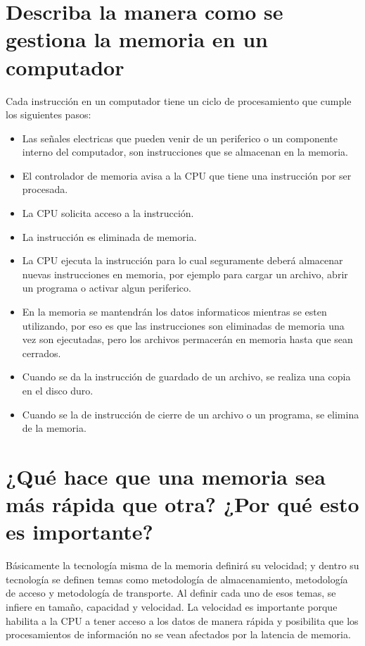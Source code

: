 \documentclass{article}
\begin{document}
\section{Describa la manera como se gestiona la memoria en un computador} 
Cada instrucción en un computador tiene un ciclo de procesamiento que cumple los siguientes pasos:
\begin{itemize}
    \item Las señales electricas que pueden venir de un periferico o un componente interno del computador, son instrucciones que se almacenan en la memoria.
    \item El controlador de memoria avisa a la CPU que tiene una instrucción por ser procesada.
    \item La CPU solicita acceso a la instrucción.
    \item La instrucción es eliminada de memoria.
    \item La CPU ejecuta la instrucción para lo cual seguramente deberá almacenar nuevas instrucciones en memoria, por ejemplo para cargar un archivo, abrir un programa o activar algun periferico.
    \item En la memoria se mantendrán los datos informaticos mientras se esten utilizando, por eso es que las instrucciones son eliminadas de memoria una vez son ejecutadas, pero los archivos permacerán en memoria hasta que sean cerrados.
    \item Cuando se da la instrucción de guardado de un archivo, se realiza una copia en el disco duro.
    \item Cuando se la de instrucción de cierre de un archivo o un programa, se elimina de la memoria.\cite{augusto}
\end{itemize}

\section{¿Qué hace que una memoria sea más rápida que otra? ¿Por qué esto es importante?} 
Básicamente la tecnología misma de la memoria definirá su velocidad; y dentro su tecnología se definen temas como metodología de almacenamiento, metodología de acceso y metodología de transporte.
Al definir cada uno de esos temas, se infiere en tamaño, capacidad y velocidad.
La velocidad es importante porque habilita a la CPU a tener acceso a los datos de manera rápida y posibilita que los procesamientos de información no se vean afectados por la latencia de memoria.\cite{augusto}



\end{document}
